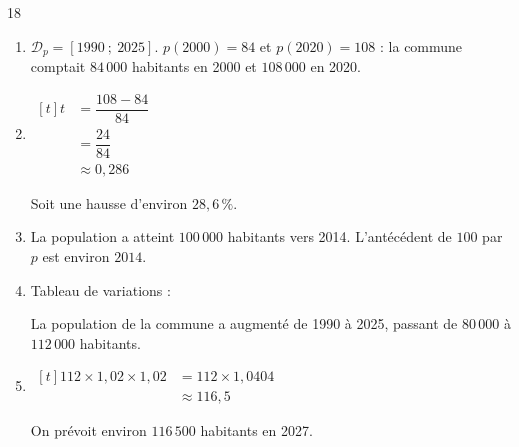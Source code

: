 \documentclass[10pt,a4paper]{article}
\begin{document}
\begin{corr}{18}
\begin{enumerate}[leftmargin=*]
    \item \(\mathcal{D}_p=[1990\ ;\ 2025]\). \(p(2000)=84\) et \(p(2020)=108\) : la commune comptait \(84\,000\) habitants en 2000 et \(108\,000\) en 2020.
    \item \(\begin{aligned}[t] t&=\dfrac{108-84}{84}\\ &=\dfrac{24}{84}\\ &\approx 0,286\end{aligned}\)

    Soit une hausse d'environ \(28,6\,\%\).
    \item La population a atteint \(100\,000\) habitants vers 2014. L'antécédent de \(100\) par \(p\) est environ \(2014\).
    \item Tableau de variations :
    \begin{center}
    \end{center}
    La population de la commune a augmenté de 1990 à 2025, passant de \(80\,000\) à \(112\,000\) habitants.
    \item \(\begin{aligned}[t] 112\times 1,02\times 1,02&=112\times 1,0404\\ &\approx 116,5\end{aligned}\)

    On prévoit environ \(116\,500\) habitants en 2027.
\end{enumerate}
\end{corr}
\end{document}
